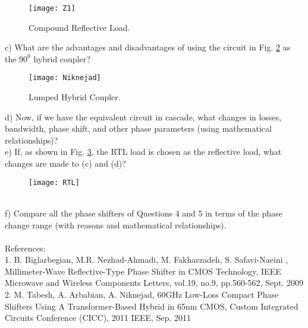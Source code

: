 \documentclass[paper=a4, fontsize=11pt]{scrartcl} %
\numberwithin{equation}{section} %
\numberwithin{figure}{section} %
\numberwithin{table}{section} %
\begin{document}
\begin{figure}[h]
\centering
\texttt{[image: Z1]}\label{cload}
\caption{Compound Reflective Load.}
\end{figure}

c) What are the advantages and disadvantages of using the circuit in Fig. \ref{L90} as the $90^0$ hybrid coupler?\\

\begin{figure}[h]
\centering
\texttt{[image: Niknejad]}
\caption{Lumped Hybrid Coupler.}
\label{L90}
\end{figure}

d) Now, if we have the equivalent circuit in cascade, what changes in losses, bandwidth, phase shift, and other phase parameters (using mathematical relationships)?\\

e) If, as shown in Fig. \ref{RTL}, the RTL load is chosen as the reflective load, what changes are made to (c) and (d)?\\
\begin{figure}[h]
\centering
\texttt{[image: RTL]} \label{RTL}
\end{figure}
\\
f) Compare all the phase shifters of Questions 4 and 5 in terms of the phase change range (with reasons and mathematical relationships).
\\
\\
References:\\
1. B. Biglarbegian, M.R. Nezhad-Ahmadi, M. Fakharzadeh, S. Safavi-Naeini , Millimeter-Wave Reflective-Type Phase Shifter in CMOS Technology, IEEE Microwave and Wireless Components Letters, vol.19, no.9, pp.560-562, Sept. 2009\\
2.  M. Tabesh, A. Arbabian, A. Niknejad, 60GHz Low-Loss Compact Phase Shifters Using A Transformer-Based Hybrid in 65nm CMOS, Custom Integrated Circuits Conference (CICC), 2011 IEEE, Sep. 2011

\end{document}
